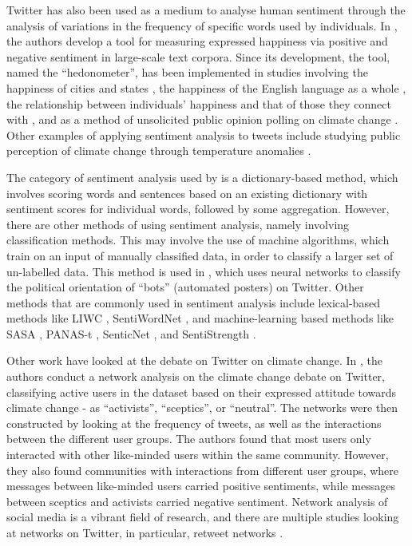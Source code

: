\documentclass[12pt,onecolumn,twoside]{layout}
\begin{document}
Twitter has also been used as a medium to analyse human sentiment through the analysis of variations in the frequency of specific words used by individuals. In \citet{Dodds2011}, the authors develop a tool for measuring expressed happiness via positive and negative sentiment in large-scale text corpora. Since its development, the tool, named the ``hedonometer'', has been implemented in studies involving the happiness of cities and states \citep{Bliss2012}, the happiness of the English language as a whole \citep{Kloumann2012}, the relationship between individuals' happiness and that of those they connect with \citep{Mitchell2013}, and as a method of unsolicited public opinion polling on climate change \citep{Cody2015}. Other examples of applying sentiment analysis to tweets include studying public perception of climate change through temperature anomalies \citep{Moore2019}.

The category of sentiment analysis used by \citet{Dodds2011} is a dictionary-based method, which involves scoring words and sentences based on an existing dictionary with sentiment scores for individual words, followed by some aggregation. However, there are other methods of using sentiment analysis, namely involving classification methods. This may involve the use of machine algorithms, which train on an input of manually classified data, in order to classify a larger set of un-labelled data. This method is used in \citep{Stukal2019}, which uses neural networks to classify the political orientation of ``bots'' (automated posters) on Twitter. Other methods that are commonly used in sentiment analysis include lexical-based methods like LIWC \citep{Tausczik2009}, SentiWordNet \citep{Esuli2006}, and machine-learning based methods like SASA \citep{Wang2012}, PANAS-t \citep{Goncalves2013a}, SenticNet \citep{Cambria2010}, and SentiStrength \citep{Thelwall2017}.

Other work have looked at the debate on Twitter on climate change. In \citep{Williams2015}, the authors conduct a network analysis on the climate change debate on Twitter, classifying active users in the dataset based on their expressed attitude towards climate change - as ``activists'', ``sceptics'', or ``neutral''. The networks were then constructed by looking at the frequency of tweets, as well as the interactions between the different user groups. The authors found that most users only interacted with other like-minded users within the same community. However, they also found communities with interactions from different user groups, where messages between like-minded users carried positive sentiments, while messages between sceptics and activists carried negative sentiment. Network analysis of social media is a vibrant field of research, and there are multiple studies looking at networks on Twitter, in particular, retweet networks \citep{Cherepnalkoski2016, Stewart2018}.
\end{document}
